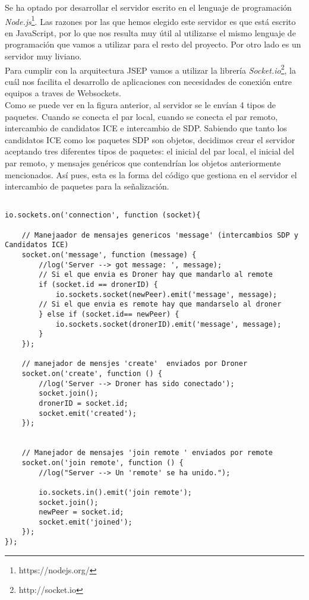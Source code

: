 Se ha optado por desarrollar el servidor escrito en el lenguaje de programación \emph{Node.js}\footnote{https://nodejs.org/}. Las razones por las que hemos elegido este servidor es que está escrito en JavaScript, por lo que nos resulta muy útil al utilizarse el mismo lenguaje de programación que vamos a utilizar para el resto del proyecto. Por otro lado es un servidor muy liviano.\\

Para cumplir con la arquitectura JSEP vamos a utilizar la librería \emph{Socket.io}\footnote{http://socket.io}, la cuál nos facilita el desarrollo de aplicaciones con necesidades de conexión entre equipos a traves de Websockets.\\

Como se puede ver en la figura anterior, al servidor se le envían 4 tipos de paquetes. Cuando se conecta el par local, cuando se conecta el par remoto, intercambio de candidatos ICE e intercambio de SDP. Sabiendo que tanto los candidatos ICE como los paquetes SDP son objetos, decidimos crear el servidor aceptando tres diferentes tipos de paquetes: el inicial del par local, el inicial del par remoto, y mensajes genéricos que contendrían los objetos anteriormente mencionados. Así pues, esta es la forma del código que gestiona en el servidor el intercambio de paquetes para la señalización.\\

\begin{lstlisting}[caption=Ejemplo paquete SDP]

io.sockets.on('connection', function (socket){

	// Manejaador de mensajes genericos 'message' (intercambios SDP y Candidatos ICE)
	socket.on('message', function (message) {
		//log('Server --> got message: ', message);
		// Si el que envia es Droner hay que mandarlo al remote
		if (socket.id == dronerID) {
			io.sockets.socket(newPeer).emit('message', message);
		// Si el que envia es remote hay que mandarselo al droner
		} else if (socket.id== newPeer) {
			io.sockets.socket(dronerID).emit('message', message);
		} 
	});

	// manejador de mensjes 'create'  enviados por Droner
	socket.on('create', function () {
		//log('Server --> Droner has sido conectado');
		socket.join();
		dronerID = socket.id;
		socket.emit('created');
	});
	

	// Manejador de mensajes 'join remote ' enviados por remote
	socket.on('join remote', function () {
		//log("Server --> Un 'remote' se ha unido.");
		
		io.sockets.in().emit('join remote');
		socket.join();
		newPeer = socket.id;
		socket.emit('joined');
	});
});
\end{lstlisting}


